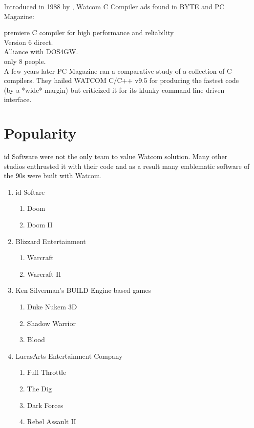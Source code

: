 Introduced in 1988 by , Watcom C Compiler ads found in BYTE and PC Magazine:\\
\par
{}
premiere C compiler for high performance and reliability\\
Version 6 direct.\\
Alliance with DOS4GW.\\
only 8 people.\\
A few years later
PC Magazine ran a comparative study of a collection of C compilers.  They
hailed WATCOM C/C++ v9.5 for producing the fastest code (by a *wide* margin)
but criticized it for its klunky command line driven interface.\\

\section{Popularity}
id Software were not the only team to value Watcom solution. Many other studios enthrusted it with their code and as a result many emblematic software of the 90s were built with Watcom.\\
\begin{enumerate}
\item id Softare 
       \begin{enumerate}
       \item Doom
       \item Doom II
       \end{enumerate} 
\item Blizzard Entertainment 
       \begin{enumerate}
       \item Warcraft
       \item Warcraft II
       \end{enumerate}
\item Ken Silverman's BUILD Engine based games
      \begin{enumerate}
       \item Duke Nukem 3D
       \item Shadow Warrior
       \item Blood
       \end{enumerate}
\item LucasArts Entertainment Company
      \begin{enumerate}
       \item Full Throttle
       \item  The Dig
       \item Dark Forces
       \item Rebel Assault II       
      \end{enumerate}
\end{enumerate}
\par
